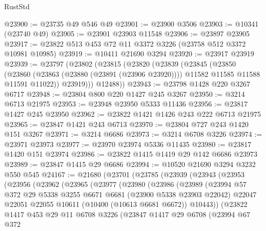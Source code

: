\begin{lexlean}{RustStd}
\begin{coremodule}
@23900 := @23735 @49 @546 @49
@23901 := @23900 @3506
@23903 := @10341 (@23740 @49)
@23905 := @23901 @23903 @11548
@23906 := @23897 @23905
@23917 := @23822 @513 @453 @72 @11 @3372 @3226 (@23758 @512 @3372 @10981 @10985)
@23919 := @10411 @21690 @3294
@23920 := @23917 @23919
@23939 := @23797
    (@23802
      (@23815
        (@23820
          (@23839
            (@23845
              (@23850
                (@23860
                  (@23863 (@23880 (@23891 (@23906 @23920))))
                  @11582
                  @11585
                  @11588
                  @11591
                  @11022))
              @23919)))
        @12488))
@23943 := @23798 @1428 @220 @3267 @6717
@23948 := @23804 @800 @220 @1427 @245 @3267
@23950 := @3214 @6713 @21975
@23953 := @23948 @23950 @5333 @11436
@23956 := @23817 @1427 @245 @23950
@23962 := @23822 @1421 @1426 @243 @222 @6713 @21975
@23965 := @23847 @1421 @243 @6713
@23970 := @23804 @727 @243 @1420 @151 @3267
@23971 := @3214 @6686
@23973 := @3214 @6708 @3226
@23974 := @23971 @23973
@23977 := @23970 @23974 @5336 @11435
@23980 := @23817 @1420 @151 @23974
@23986 := @23822 @1415 @1419 @29 @142 @6686 @23973
@23989 := @23847 @1415 @29 @6686
@23994 := @10520 @21690 @3294 @3232 @550 @545
@24167 := @21680
    (@23701
      (@23785
        (@23939
          (@23943
            (@23953
              (@23956
                (@23962
                  (@23965
                    (@23977
                      (@23980
                        (@23986
                          (@23989
                            (@23994
                              @57
                              @372
                              @29
                              @5338
                              @3255
                              @6671
                              @6681
                              (@23900 @5338 @23903 @22042)
                              @22047
                              @22051
                              @22055
                              @10611
                              (@10400 (@10613 @6681 @6672))
                              @10443))
                          (@23822
                            @1417
                            @453
                            @29
                            @11
                            @6708
                            @3226
                            (@23847
                              @1417
                              @29
                              @6708
                              (@23994
                                @67
                                @372

\end{coremodule}
\end{lexlean}
